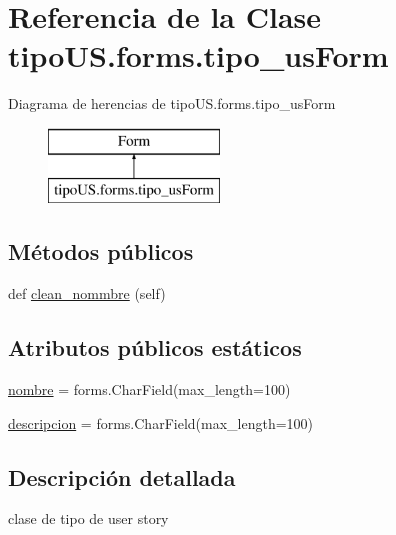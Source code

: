 \hypertarget{classtipo_u_s_1_1forms_1_1tipo__us_form}{}\section{Referencia de la Clase tipo\+U\+S.\+forms.\+tipo\+\_\+us\+Form}
\label{classtipo_u_s_1_1forms_1_1tipo__us_form}
Diagrama de herencias de tipo\+U\+S.\+forms.\+tipo\+\_\+us\+Form\begin{figure}[H]
\begin{center}
\leavevmode
\includegraphics[height=2.000000cm]{classtipo_u_s_1_1forms_1_1tipo__us_form}
\end{center}
\end{figure}
\subsection*{Métodos públicos}
\begin{DoxyCompactItemize}
\item 
def \hyperlink{classtipo_u_s_1_1forms_1_1tipo__us_form_a296fa29ee8cba128063a54df916f3c6d}{clean\+\_\+nommbre} (self)
\end{DoxyCompactItemize}
\subsection*{Atributos públicos estáticos}
\begin{DoxyCompactItemize}
\item 
\hyperlink{classtipo_u_s_1_1forms_1_1tipo__us_form_ab850f5bbdd80b05c50481c75d21d361f}{nombre} = forms.\+Char\+Field(max\+\_\+length=100)
\item 
\hyperlink{classtipo_u_s_1_1forms_1_1tipo__us_form_a3816ae4b37d3c70c2bf758e621a82195}{descripcion} = forms.\+Char\+Field(max\+\_\+length=100)
\end{DoxyCompactItemize}


\subsection{Descripción detallada}
\begin{DoxyVerb}clase de tipo de user story \end{DoxyVerb}
 

